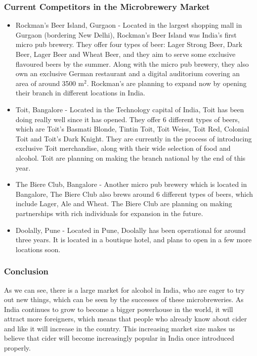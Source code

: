 \documentclass{article}
\begin{document}
\subsubsection{Current Competitors in the Microbrewery Market}
\begin{itemize}
\item Rockman's Beer Island, Gurgaon - Located in the largest shopping mall in
			 Gurgaon (bordering New Delhi), Rockman's Beer Island was India's first
			 micro pub brewery. They offer four types of beer: Lager Strong Beer, Dark
			 Beer, Lager Beer and Wheat Beer, and they aim to serve some exclusive
 	     flavoured beers by the summer. Along with the micro pub brewery, they also
			 own an exclusive German restaurant and a digital auditorium covering an
	     area of around 3500 m$^2$. Rockman's are planning to expand now by opening
			 their branch in different locations in India.
\item Toit, Bangalore - Located in the Technology capital of India, Toit has been
			 doing really well since it has opened. They offer 6 different types of beers,
			 which are Toit's Basmati Blonde, Tintin Toit, Toit Weiss, Toit Red, Colonial
			 Toit and Toit's Dark Knight. They are currently in the process of introducing
			 exclusive Toit merchandise, along with their wide selection of food and alcohol.
			 Toit are planning on making the branch national by the end of this year.
\item The Biere Club, Bangalore - Another micro pub brewery which is located in
			 Bangalore, The Biere Club also brews around 6 different types of beers, which
			 include Lager, Ale and Wheat. The Biere Club are planning on making
			 partnerships with rich individuals for expansion in the future.
\item Doolally, Pune - Located in Pune, Doolally has been operational for around
			 three years. It is located in a boutique hotel, and plans to open in a few more
			 locations soon.
\end{itemize}

\subsubsection{Conclusion}
As we can see, there is a large market for alcohol in India, who are eager to try
out new things, which can be seen by the successes of these microbreweries. As India
continues to grow to become a bigger powerhouse in the world, it will attract more
foreigners, which means that people who already know about cider and like it
will increase in the country. This increasing market size makes us believe that
cider will become increasingly popular in India once introduced properly.
\end{document}
